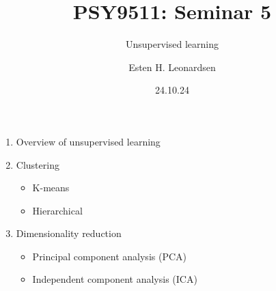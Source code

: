 \documentclass{beamer}
\title{PSY9511: Seminar 5}
\subtitle{Unsupervised learning}
\author{Esten H. Leonardsen}
\date{24.10.24}
\begin{document}
	\begin{frame}
	 	\maketitle
	\end{frame}

    \begin{frame}
        \begin{enumerate}
            \item Overview of unsupervised learning
            \item Clustering
            \begin{itemize}
                \item K-means
                \item Hierarchical
            \end{itemize}
            \item Dimensionality reduction
            \begin{itemize}
                \item Principal component analysis (PCA)
                \item Independent component analysis (ICA)
            \end{itemize}
        \end{enumerate}
    \end{frame}

    
\end{document}
